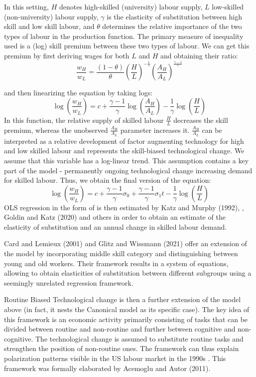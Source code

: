 \documentclass[11pt]{article}
\begin{document}
In this setting, $H$ denotes high-skilled (university) labour supply, $L$ low-skilled (non-university) labour supply, $\gamma$ is the elasticity of substitution between high skill and low skill labour, and $\theta$ determines the relative importance of the two types of labour in the production function. The primary measure of inequality used is a (log) skill premium between these two types of labour. We can get this premium by first deriving wages for both $L$ and $H$ and obtaining their ratio:
\[\frac{w_{H}}{w_{L}} = \frac{(1 - \theta)}{\theta} \left(\frac{H}{L}\right)^{-\frac{1}{\gamma}}\left(\frac{A_{H}}{A_{L}}\right)^{\frac{\gamma - 1}{\gamma}}\]

and then linearizing the equation by taking logs:
\[\log(\frac{w_{H}}{w_{L}}) = c + \frac{\gamma - 1}{\gamma}\log(\frac{A_{H}}{A_{L}}) - \frac{1}{\gamma}\log(\frac{H}{L})\]
In this function, the relative supply of skilled labour $\frac{H}{L}$ decreases the skill premium, whereas the unobserved $\frac{A_{H}}{A_{L}}$ parameter increases it. $\frac{A_{H}}{A_{L}}$ can be interpreted as a relative development of factor augmenting technology for high and low skilled labour and represents the skill-biased technological change. We assume that this variable has a log-linear trend. This assumption contains a key part of the model - permanently ongoing technological change increasing demand for skilled labour. Thus, we obtain the final version of the equation:
\begin{equation}
\label{eqn:STBC_regression}
\log(\frac{w_{H}}{w_{L}}) = c + \frac{\gamma - 1}{\gamma}\sigma_0 + \frac{\gamma - 1}{\gamma}\sigma_{1}t - \frac{1}{\gamma}\log(\frac{H}{L})
\end{equation}
OLS regression in the form of is then estimated by Katz and Murphy (1992), \citep{acemoglu2012does}, Goldin and Katz (2020) and others in order to obtain an estimate of the elasticity of substitution and an annual change in skilled labour demand.

Card and Lemieux (2001) and Glitz and Wissmann (2021) offer an extension of the model by incorporating middle skill category and distinguishing between young and old workers. Their framework results in a system of equations, allowing to obtain elasticities of substitution between different subgroups using a seemingly unrelated regression framework.

Routine Biased Technological change is then a further extension of the model above (in fact, it nests the Canonical model as its specific case). The key idea of this framework is an economic activity primarily consisting of tasks that can be divided between routine and non-routine and further between cognitive and non-cognitive. The technological change is assumed to substitute routine tasks and strengthen the position of non-routine ones. The framework can thus explain polarization patterns visible in the US labour market in the 1990s \citep{autor2014polanyi}. This framework was formally elaborated by Acemoglu and Autor (2011).
\end{document}
